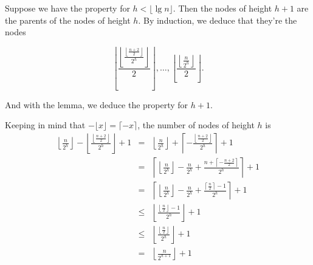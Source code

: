\documentclass[a4paper,12pt]{article}
\begin{document}
Suppose we have the property for $h < \lfloor \lg n \rfloor$.  Then
the nodes of height $h+1$ are the parents of the nodes of height $h$.
By induction, we deduce that they're the nodes

\[\left\lfloor \frac{\left\lfloor
\frac{\left\lfloor\frac{n+2}{2}\right\rfloor}{2^h}\right\rfloor
}{2}\right\rfloor,
\ldots, \left\lfloor \frac{\left\lfloor \frac{n}{2^h}
  \right\rfloor}{2} \right\rfloor.\]

And with the lemma, we deduce the property for $h+1$.

\medskip
Keeping in mind that $-\lfloor x\rfloor = \lceil -x \rceil$, the
number of nodes of height $h$ is
\begin{eqnarray*}
  \left\lfloor \frac{n}{2^h} \right\rfloor -\left\lfloor
  \frac{\left\lfloor\frac{n+2}{2}\right\rfloor}{2^h}\right\rfloor + 1
  &=&
  \left\lfloor \frac{n}{2^h} \right\rfloor + \left\lceil
  -\frac{\left\lfloor\frac{n+2}{2}\right\rfloor}{2^h}\right\rceil + 1 \\
  &=& \left\lceil
  \left\lfloor \frac{n}{2^h} \right\rfloor - \frac{n}{2^h} +
  \frac{n + \left\lceil -\frac{n+2}{2}\right\rceil}{2^h}
  \right\rceil + 1 \\
  &=& \left\lceil
  \left\lfloor \frac{n}{2^h} \right\rfloor - \frac{n}{2^h} +
  \frac{\left\lceil \frac{n}{2}\right\rceil - 1}{2^h}
  \right\rceil + 1 \\
  &\le& \left\lfloor \frac{\left\lfloor \frac{n}{2}\right\rfloor -
    1}{2^h}\right\rfloor + 1 \\
  &\le& \left\lfloor \frac{\left\lfloor
    \frac{n}{2}\right\rfloor}{2^h}\right\rfloor + 1 \\
  &=& \left\lfloor \frac{n}{2^{h+1}}\right\rfloor + 1
\end{eqnarray*}
\end{document}

